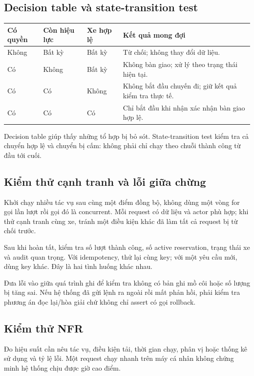 \subsection{Decision table và state-transition test}
\begin{center}\begin{tabularx}{\linewidth}{|C{23mm}|C{24mm}|C{24mm}|Y|}\hline
\textbf{Có quyền} & \textbf{Còn hiệu lực} & \textbf{Xe hợp lệ} & \textbf{Kết quả mong đợi}\\\hline
Không & Bất kỳ & Bất kỳ & Từ chối; không thay đổi dữ liệu.\\\hline
Có & Không & Bất kỳ & Không bàn giao; xử lý theo trạng thái hiện tại.\\\hline
Có & Có & Không & Không bắt đầu chuyến đi; giữ kết quả kiểm tra thực tế.\\\hline
Có & Có & Có & Chỉ bắt đầu khi nhận xác nhận bàn giao hợp lệ.\\\hline
\end{tabularx}\end{center}
Decision table giúp thấy những tổ hợp bị bỏ sót. State-transition test kiểm tra cả chuyển hợp lệ và chuyển bị cấm: không phải chỉ chạy theo chuỗi thành công từ đầu tới cuối.

\subsection{Kiểm thử cạnh tranh và lỗi giữa chừng}
Khởi chạy nhiều tác vụ sau cùng một điểm đồng bộ, không dùng một vòng for gọi lần lượt rồi gọi đó là concurrent. Mỗi request có dữ liệu và actor phù hợp; khi thử cạnh tranh cùng xe, tránh một điều kiện khác đã làm tất cả request bị từ chối trước.

Sau khi hoàn tất, kiểm tra số lượt thành công, số active reservation, trạng thái xe và audit quan trọng. Với idempotency, thử lại cùng key; với một yêu cầu mới, dùng key khác. Đây là hai tình huống khác nhau.

Đưa lỗi vào giữa quá trình ghi để kiểm tra không có bản ghi mồ côi hoặc số lượng bị tăng sai. Nếu hệ thống đã gửi lệnh ra ngoài rồi mất phản hồi, phải kiểm tra phương án đọc lại/hòa giải chứ không chỉ assert có gọi rollback.

\subsection{Kiểm thử NFR}
Đo hiệu suất cần nêu tác vụ, điều kiện tải, thời gian chạy, phân vị hoặc thống kê sử dụng và tỷ lệ lỗi. Một request chạy nhanh trên máy cá nhân không chứng minh hệ thống chịu được giờ cao điểm.

